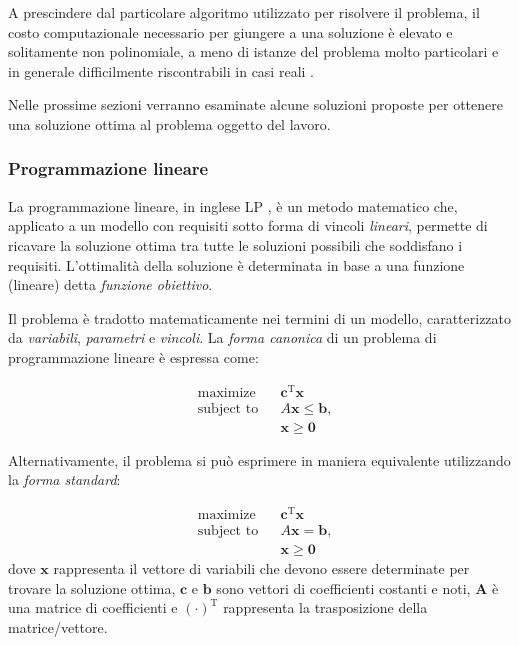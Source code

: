 A prescindere dal particolare algoritmo utilizzato per risolvere il problema, 
il costo computazionale necessario per giungere a una soluzione è elevato e 
solitamente non polinomiale, a meno di istanze del problema molto particolari e 
in generale difficilmente riscontrabili in casi reali 
\cite{PolynomialCompleteScheduling}.

Nelle prossime sezioni verranno esaminate alcune soluzioni proposte per 
ottenere una soluzione ottima al problema oggetto del lavoro.

\subsubsection{Programmazione lineare}
La programmazione lineare, in inglese \ac{LP} \cite{DantzigLinearProgramming}, è
un metodo matematico che, applicato a un modello con requisiti sotto forma di
vincoli \emph{lineari}, permette di ricavare la soluzione ottima tra tutte le
soluzioni possibili che soddisfano i requisiti. L'ottimalità della soluzione è
determinata in base a una funzione (lineare) detta \emph{funzione obiettivo}.

Il problema è tradotto matematicamente nei termini di un modello, 
caratterizzato da \emph{variabili}, \emph{parametri} e \emph{vincoli}.
La \emph{forma canonica} di un problema di programmazione lineare è espressa 
come:

\begin{align*}
& \text{maximize}   && \mathbf{c}^\mathrm{T} \mathbf{x}\\
& \text{subject to} && A \mathbf{x} \le \mathbf{b},\\
&  && \mathbf{x} \ge \mathbf{0}
\end{align*}

Alternativamente, il problema si può esprimere in maniera equivalente utilizzando
la  \emph{forma standard}:

\begin{align*}
 & \text{maximize}   && \mathbf{c}^\mathrm{T} \mathbf{x}\\
& \text{subject to} && A \mathbf{x} = \mathbf{b}, \\
&  && \mathbf{x} \ge \mathbf{0}
\end{align*}
dove $\mathbf{x}$ rappresenta il vettore di variabili che devono essere 
determinate per trovare la soluzione ottima, $\mathbf{c}$ e $\mathbf{b}$ sono 
vettori di coefficienti costanti e noti, $\mathbf{A}$ è una matrice di 
coefficienti e $(\mathord{\cdot})^\mathrm{T}$ 
rappresenta la trasposizione della matrice/vettore.

